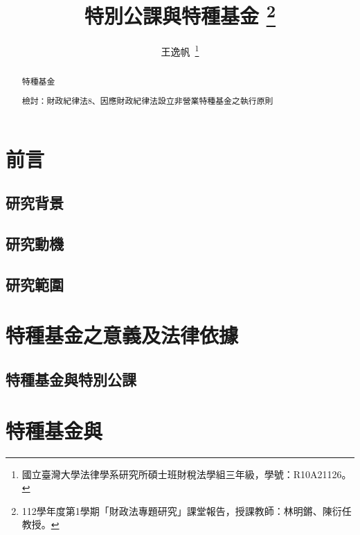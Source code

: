 \documentclass[14pt,a4paper]{article}
\author{王逸帆\,
\thanks{國立臺灣大學法律學系研究所碩士班財稅法學組三年級，學號：R10A21126。}
\vspace{-60em}
}
\date{}
\title{特別公課與特種基金
\thanks{
  112學年度第1學期「財政法專題研究」課堂報告，授課教師：林明鏘、陳衍任教授。}}
\begin{document}
\maketitle
\makeatother

\vspace{1pt}

\begin{abstract}
\setlength{\parindent}{2em}
\noindent
\hspace*{0.9\parindent}

特種基金

檢討：財政紀律法8、因應財政紀律法設立非營業特種基金之執行原則

   \end{abstract}



\thispagestyle{empty} %
\clearpage
    

\tableofcontents 


\thispagestyle{empty} %
\clearpage
\setcounter{page}{1} %

\section*{前言}
\subsection*{研究背景}
\subsection*{研究動機}
\subsection*{研究範圍}



\section{特種基金之意義及法律依據}

\subsection{特種基金與特別公課}



\section{特種基金與}
\end{document}
